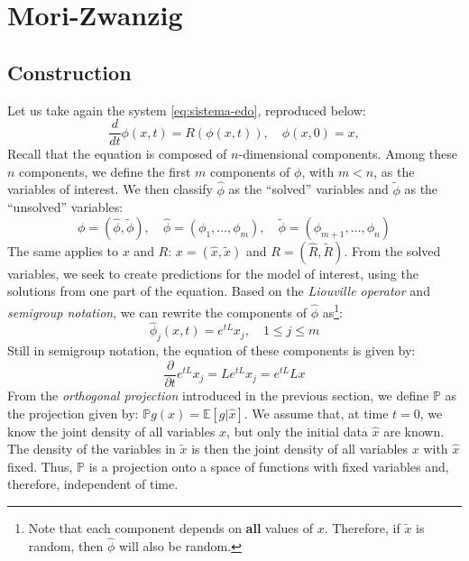 \documentclass[12pt]{article}
\begin{document}
\section{Mori-Zwanzig}
\subsection{Construction}
Let us take again the system \eqref{eq:sistema-edo}, reproduced below:
\begin{equation*}
    \frac{d}{dt} \phi(x,t) = R(\phi(x,t)), \quad \phi(x, 0) = x,
\end{equation*}
Recall that the equation is composed of $n$-dimensional components. Among these $n$ components, we define the first $m$ components of $\phi$, with $m < n$, as the variables of interest. We then classify $\hat{\phi}$ as the “solved” variables and $\tilde{\phi}$ as the “unsolved” variables:
\begin{equation*}
    \phi = (\hat{\phi}, \tilde{\phi}), \quad \hat{\phi} = \left(\phi_1, \ldots, \phi_m \right), \quad \tilde{\phi} = \left(\phi_{m+1}, \ldots, \phi_n\right)
\end{equation*}
The same applies to $x$ and $R$: $x = (\hat{x}, \tilde{x})$ and $R = (\hat{R}, \tilde{R})$. From the solved variables, we seek to create predictions for the model of interest, using the solutions from one part of the equation.
Based on the \textit{Liouville operator} and \textit{semigroup notation}, we can rewrite the components of $\hat{\phi}$ as\footnote{Note that each component depends on \textbf{all} values of $x$. Therefore, if $\tilde{x}$ is random, then $\hat{\phi}$ will also be random.}:
\begin{equation*}
\hat{\phi}_j(x,t) = e^{tL}x_j, \quad 1 \leq j \leq m
\end{equation*}
Still in semigroup notation, the equation of these components is given by:
\begin{equation}
    \frac{\partial}{\partial t}e^{tL}x_j = Le^{tL}x_j = e^{tL}Lx
    \label{eq:mori-zwanzig-semigroup-notation}
\end{equation}
From the \textit{orthogonal projection} introduced in the previous section, we define $\mathbb{P}$ as the projection given by: $\mathbb{P}g(x) = \mathbb{E}[g|\hat{x}]$. We assume that, at time $t = 0$, we know the joint density of all variables $x$, but only the initial data $\hat{x}$ are known. The density of the variables in $\tilde{x}$ is then the joint density of all variables $x$ with $\hat{x}$ fixed. Thus, $\mathbb{P}$ is a projection onto a space of functions with fixed variables and, therefore, independent of time.
\end{document}
